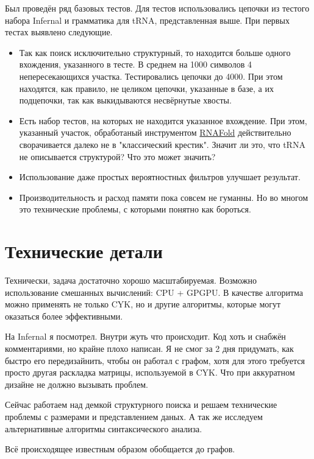 \documentclass[a5paper]{article}
\begin{document}
Был проведён ряд базовых тестов. Для тестов использовались цепочки из тестого набора Infernal и грамматика для tRNA, представленная выше. При первых тестах выявлено следующие.
\begin{itemize}
\item Так как поиск исключительно структурный, то находится больше одного вхождения, указанного в тесте. В среднем на 1000 символов 4 непересекающихся участка. Тестировались цепочки до 4000.
 При этом находятся, как правило, не целиком цепочки, указанные в базе, а их подцепочки, так как выкидываются несвёрнутые хвосты.
\item Есть набор тестов, на которых не находится указанное вхождение. При этом, указанный участок, обработаный инструментом \href{http://rna.tbi.univie.ac.at/cgi-bin/RNAfold.cgi}{RNAFold} действительно
 сворачивается далеко не в "классический крестик". Значит ли это, что tRNA не описывается структурой? Что это может значить?
\item Использование даже простых вероятностных фильтров улучшает результат.
\item Производительность и расход памяти пока совсем не гуманны. Но во многом это технические проблемы, с которыми понятно как бороться.
\end{itemize}

\section{Технические детали}
Технически, задача достаточно хорошо масштабируемая. Возможно использование смешанных вычислений: CPU + GPGPU. В качестве алгоритма можно применять не только CYK, но и другие 
алгоритмы, которые могут оказаться более эффективными.

На Infernal я посмотрел. Внутри жуть что происходит. Код хоть и снабжён комментариями, но крайне плохо написан. Я не смог за 2 дня придумать, как быстро его передизайнить, чтобы он работал с графом, 
хотя для этого требуется просто другая раскладка матрицы, используемой в CYK. Что при аккуратном 
дизайне не должно вызывать проблем.


Сейчас работаем над демкой структурного поиска и решаем технические проблемы с размерами и представлением даных. А так же исследуем альтернативные алгоритмы синтаксического анализа.

Всё происходящее известным образом обобщается до графов.


%
\end{document}
